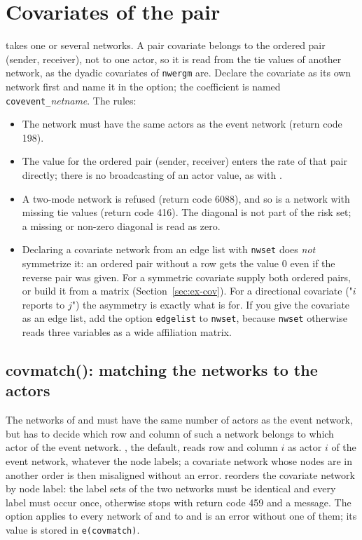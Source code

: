 \section{Covariates of the pair}\label{sec:covevent}

 takes one or several networks. A pair covariate belongs to the ordered pair (sender, receiver), not to one actor, so it is read from the tie values of another network, as the dyadic covariates of \texttt{nwergm} are. Declare the covariate as its own network first and name it in the option; the coefficient is named \texttt{covevent\_}\emph{netname}. The rules:
\begin{itemize}[nosep]
  \item The network must have the same actors as the event network (return code 198).
  \item The value for the ordered pair (sender, receiver) enters the rate of that pair directly; there is no broadcasting of an actor value, as with .
  \item A two-mode network is refused (return code 6088), and so is a network with missing tie values (return code 416). The diagonal is not part of the risk set; a missing or non-zero diagonal is read as zero.
  \item Declaring a covariate network from an edge list with \texttt{nwset} does \emph{not} symmetrize it: an ordered pair without a row gets the value 0 even if the reverse pair was given. For a symmetric covariate supply both ordered pairs, or build it from a matrix (Section~\ref{sec:ex-cov}). For a directional covariate ("$i$ reports to $j$") the asymmetry is exactly what  is for. If you give the covariate as an edge list, add the option \texttt{edgelist} to \texttt{nwset}, because \texttt{nwset} otherwise reads three variables as a wide affiliation matrix.
\end{itemize}

\subsection{covmatch(): matching the networks to the actors}\label{sec:covmatch}

The networks of  and  must have the same number of actors as the event network, but \nwrem{} has to decide which row and column of such a network belongs to which actor of the event network. , the default, reads row and column $i$ as actor $i$ of the event network, whatever the node labels; a covariate network whose nodes are in another order is then misaligned without an error.  reorders the covariate network by node label: the label sets of the two networks must be identical and every label must occur once, otherwise \nwrem{} stops with return code 459 and a message. The option applies to every network of  and to  and is an error without one of them; its value is stored in \texttt{e(covmatch)}.

